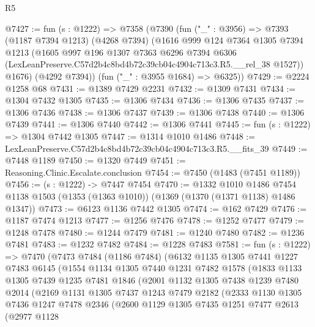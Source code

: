 \begin{lexlean}{R5}
\begin{coremodule}
@7427 := fun (s : @1222) =>
  @7358
    (@7390
      (fun ("_" : @3956) =>
      @7393
        (@1187 @7394 @1213)
        (@4268 @7394)
        (@1616
          @999
          @124
          @7364
          @1305
          @7394
          @1213
          (@1605
            @997
            @196
            @1307
            @7363
            @6296
            @7394
            @6306
            (LexLeanPreserve.C57d2b4c8bd4b72c39cb04c4904c713c3.R5.__rel_38 @1527))
          @1676)
        (@4292 @7394))
      (fun ("_" : @3955 @1684) => @6325))
@7429 := @2224 @1258 @68
@7431 := @1389 @7429 @2231
@7432 := @1309 @7431
@7434 := @1304 @7432 @1305
@7435 := @1306 @7434
@7436 := @1306 @7435
@7437 := @1306 @7436
@7438 := @1306 @7437
@7439 := @1306 @7438
@7440 := @1306 @7439
@7441 := @1306 @7440
@7442 := @1306 @7441
@7445 := fun (s : @1222) => @1304 @7442 @1305
@7447 := @1314 @1010 @1486
@7448 := LexLeanPreserve.C57d2b4c8bd4b72c39cb04c4904c713c3.R5.__fits_39
@7449 := @7448 @1189
@7450 := @1320 @7449
@7451 := Reasoning.Clinic.Escalate.conclusion
@7454 := @7450 (@1483 (@7451 @1189))
@7456 := (s : @1222) -> @7447 @7454
@7470 := @1332
    @1010
    @1486
    @7454
    @1138
    @1503
    (@1353 (@1363 @1010))
    (@1369 (@1370 (@1371 @1138) @1486 @1347))
@7473 := @6123 @1136 @7442 @1305
@7474 := @162 @7429
@7476 := @1187 @7474 @1213
@7477 := @1256 @7476
@7478 := @1252 @7477
@7479 := @1248 @7478
@7480 := @1244 @7479
@7481 := @1240 @7480
@7482 := @1236 @7481
@7483 := @1232 @7482
@7484 := @1228 @7483
@7581 := fun (s : @1222) =>
  @7470
    (@7473
      @7484
      (@1186 @7484)
      (@6132
        @1135
        @1305
        @7441
        @1227
        @7483
        @6145
        (@1554
          @1134
          @1305
          @7440
          @1231
          @7482
          @1578
          (@1833
            @1133
            @1305
            @7439
            @1235
            @7481
            @1846
            (@2001
              @1132
              @1305
              @7438
              @1239
              @7480
              @2014
              (@2169
                @1131
                @1305
                @7437
                @1243
                @7479
                @2182
                (@2333
                  @1130
                  @1305
                  @7436
                  @1247
                  @7478
                  @2346
                  (@2600
                    @1129
                    @1305
                    @7435
                    @1251
                    @7477
                    @2613
                    (@2977
                      @1128

\end{coremodule}
\end{lexlean}
